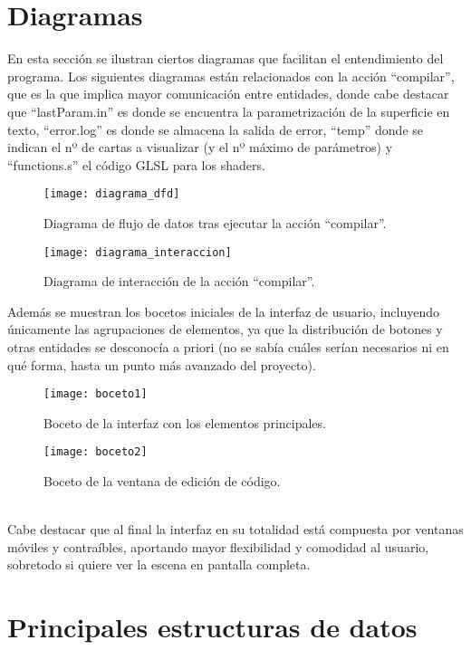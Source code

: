 \section{Diagramas}
En esta sección se ilustran ciertos diagramas que facilitan el entendimiento del programa. Los siguientes diagramas están relacionados con la acción ``compilar'', que es la que implica mayor comunicación entre entidades, donde cabe destacar que ``lastParam.in'' es donde se encuentra la parametrización de la superficie en texto, ``error.log'' es donde se almacena la salida de error, ``temp'' donde se indican el nº de cartas a visualizar (y el nº máximo de parámetros) y ``functions.s'' el código GLSL para los shaders.\\
\begin{figure}[h]
  	\centering
  	\texttt{[image: diagrama\_dfd]}
  	\caption{Diagrama de flujo de datos tras ejecutar la acción ``compilar''.}
  	\label{fig:diagrama_dfd}
\end{figure}
\newpage
\begin{figure}[h]
  	\centering
  	\texttt{[image: diagrama\_interaccion]}
  	\caption{Diagrama de interacción de la acción ``compilar''.}
  	\label{fig:diagrama_interaccion}
\end{figure}
\newpage
Además se muestran los bocetos iniciales de la interfaz de usuario, incluyendo únicamente las agrupaciones de elementos, ya que la distribución de botones y otras entidades se desconocía a priori (no se sabía cuáles serían necesarios ni en qué forma, hasta un punto más avanzado del proyecto).\\
\begin{figure}[h]
  	\centering
  	\texttt{[image: boceto1]}
  	\caption{Boceto de la interfaz con los elementos principales.}
  	\texttt{[image: boceto2]}
  	\caption{Boceto de la ventana de edición de código.}
  	\label{fig:bocetos_interfaz}
\end{figure}
\\Cabe destacar que al final la interfaz en su totalidad está compuesta por ventanas móviles y contraíbles, aportando mayor flexibilidad y comodidad al usuario, sobretodo si quiere ver la escena en pantalla completa.

\section{Principales estructuras de datos}

